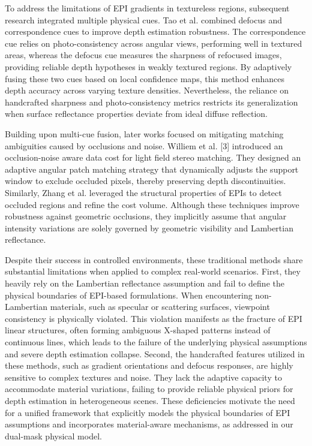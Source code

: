 To address the limitations of EPI gradients in textureless regions, subsequent research integrated multiple physical cues. Tao et al. combined defocus and correspondence cues to improve depth estimation robustness. The correspondence cue relies on photo-consistency across angular views, performing well in textured areas, whereas the defocus cue measures the sharpness of refocused images, providing reliable depth hypotheses in weakly textured regions. By adaptively fusing these two cues based on local confidence maps, this method enhances depth accuracy across varying texture densities. Nevertheless, the reliance on handcrafted sharpness and photo-consistency metrics restricts its generalization when surface reflectance properties deviate from ideal diffuse reflection.

Building upon multi-cue fusion, later works focused on mitigating matching ambiguities caused by occlusions and noise. Williem et al. [3] introduced an occlusion-noise aware data cost for light field stereo matching. They designed an adaptive angular patch matching strategy that dynamically adjusts the support window to exclude occluded pixels, thereby preserving depth discontinuities. Similarly, Zhang et al. leveraged the structural properties of EPIs to detect occluded regions and refine the cost volume. Although these techniques improve robustness against geometric occlusions, they implicitly assume that angular intensity variations are solely governed by geometric visibility and Lambertian reflectance.

Despite their success in controlled environments, these traditional methods share substantial limitations when applied to complex real-world scenarios. First, they heavily rely on the Lambertian reflectance assumption and fail to define the physical boundaries of EPI-based formulations. When encountering non-Lambertian materials, such as specular or scattering surfaces, viewpoint consistency is physically violated. This violation manifests as the fracture of EPI linear structures, often forming ambiguous X-shaped patterns instead of continuous lines, which leads to the failure of the underlying physical assumptions and severe depth estimation collapse. Second, the handcrafted features utilized in these methods, such as gradient orientations and defocus responses, are highly sensitive to complex textures and noise. They lack the adaptive capacity to accommodate material variations, failing to provide reliable physical priors for depth estimation in heterogeneous scenes. These deficiencies motivate the need for a unified framework that explicitly models the physical boundaries of EPI assumptions and incorporates material-aware mechanisms, as addressed in our dual-mask physical model.

